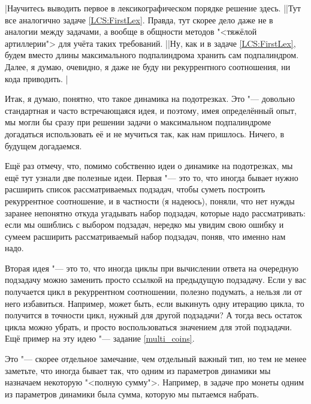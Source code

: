 \task|Научитесь выводить первое в лексикографическом порядке решение здесь.
||Тут все аналогично задаче \ref{LCS:FirstLex}. Правда, тут скорее дело даже не в аналогии между 
задачами, а вообще в общности методов "<тяжёлой артиллерии"> для учёта таких требований.
||Ну, как и в задаче \ref{LCS:FirstLex}, будем вместо длины максимального подпалиндрома хранить сам 
подпалиндром. Далее, я думаю, очевидно, я даже не буду ни рекуррентного соотношения, ни кода 
приводить.
|

Итак, я думаю, понятно, что такое динамика на подотрезках. Это "--- довольно стандартная и часто встречающаяся идея, и поэтому, имея определённый опыт, мы могли бы сразу при решении задачи о максимальном подпалиндроме догадаться использовать её и не мучиться так, как нам пришлось. Ничего, в будущем догадаемся.

Ещё раз отмечу, что, помимо собственно идеи о динамике на подотрезках, мы ещё тут узнали две
полезные идеи. Первая "--- это то, что иногда бывает нужно расширить список рассматриваемых
подзадач, чтобы суметь построить рекуррентное соотношение, и в частности (я надеюсь), поняли, что
нет нужды заранее непонятно откуда угадывать набор подзадач, которые надо рассматривать: если мы
ошиблись с выбором подзадач, нередко мы увидим свою ошибку и сумеем расширить рассматриваемый набор
подзадач, поняв, что именно нам надо. 

Вторая идея "--- это то, что иногда циклы при вычислении
ответа на очередную подзадачу можно заменить просто ссылкой на предыдущую подзадачу. Если у вас
получается цикл в рекуррентном соотношении, полезно подумать, а нельзя ли от него избавиться.
Например, может быть, если выкинуть одну итерацию цикла, то получится в точности цикл, нужный для
другой подзадачи? А тогда весь остаток цикла можно убрать, и просто воспользоваться значением для
этой подзадачи. Ещё пример на эту идею "--- задание \ref{multi_coins}.

 Это "--- скорее отдельное замечание, чем отдельный важный тип, но тем 
не менее заметьте, что иногда бывает так, что одним из параметров динамики мы назначаем некоторую 
"<полную сумму">. Например, в задаче про монеты одним из параметров динамики была сумма, которую мы 
пытаемся набрать. 

